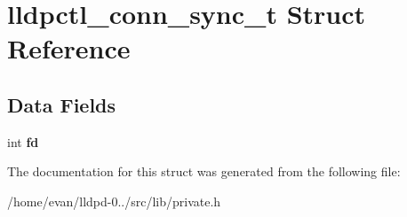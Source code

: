 \section{lldpctl\-\_\-conn\-\_\-sync\-\_\-t \-Struct \-Reference}
\label{structlldpctl__conn__sync__t}
\subsection*{\-Data \-Fields}
\begin{DoxyCompactItemize}
\item 
int {\bfseries fd}\label{structlldpctl__conn__sync__t_a6f8059414f0228f0256115e024eeed4b}

\end{DoxyCompactItemize}


\-The documentation for this struct was generated from the following file\-:\begin{DoxyCompactItemize}
\item 
/home/evan/lldpd-\/0../src/lib/private.\-h\end{DoxyCompactItemize}
